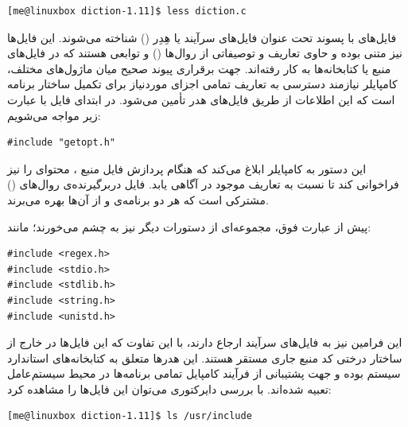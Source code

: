 \begin{latin}
\begin{lstlisting}
[me@linuxbox diction-1.11]$ less diction.c
\end{lstlisting}
\end{latin}

فایل‌های با پسوند  تحت عنوان فایل‌های سرآیند یا هِدِر () شناخته می‌شوند. این فایل‌ها نیز متنی بوده و حاوی تعاریف و توصیفاتی از روال‌ها () و توابعی هستند که در فایل‌های منبع یا کتابخانه‌ها به کار رفته‌اند. جهت برقراری پیوند صحیح میان ماژول‌های مختلف، کامپایلر نیازمند دسترسی به تعاریف تمامی اجزای موردنیاز برای تکمیل ساختار برنامه است که این اطلاعات از طریق فایل‌های هدر تأمین می‌شود. در ابتدای فایل  با عبارت زیر مواجه می‌شویم:

\begin{latin}
\begin{lstlisting}
#include "getopt.h"
\end{lstlisting}
\end{latin}

این دستور به کامپایلر ابلاغ می‌کند که هنگام پردازش فایل منبع ، محتوای  را نیز فراخوانی کند تا نسبت به تعاریف موجود در  آگاهی یابد. فایل  دربرگیرنده‌ی روال‌های () مشترکی است که هر دو برنامه‌ی  و  از آن‌ها بهره می‌برند.

پیش از عبارت فوق، مجموعه‌ای از دستورات  دیگر نیز به چشم می‌خورند؛ مانند:

\begin{latin}
\begin{lstlisting}
#include <regex.h>
#include <stdio.h>
#include <stdlib.h>
#include <string.h>
#include <unistd.h>
\end{lstlisting}
\end{latin}

این فرامین نیز به فایل‌های سرآیند ارجاع دارند، با این تفاوت که این فایل‌ها در خارج از ساختار درختی کد منبع جاری مستقر هستند. این هدرها متعلق به کتابخانه‌های استاندارد سیستم بوده و جهت پشتیبانی از فرآیند کامپایل تمامی برنامه‌ها در محیط سیستم‌عامل تعبیه شده‌اند. با بررسی دایرکتوری  می‌توان این فایل‌ها را مشاهده کرد:

\begin{latin}
\begin{lstlisting}
[me@linuxbox diction-1.11]$ ls /usr/include
\end{lstlisting}
\end{latin}

